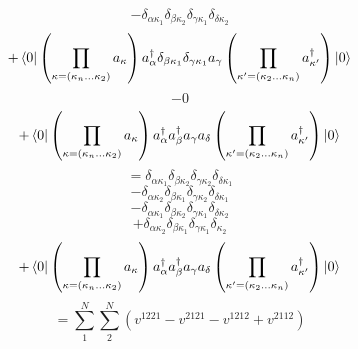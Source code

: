 \documentclass[12pt]{article}
\begin{document}
\begin{equation}
    -\delta _{\alpha  \kappa _{1}}\delta _{\beta  \kappa _{2}}\delta _{\gamma  \kappa _{1}}\delta _{\delta  \kappa _{2}}
\end{equation}
\begin{equation}
    +\bra{0}\left(\prod_{\kappa=\left(\kappa_{n}\dots\kappa_{2}\right)}a_{\kappa}\right)
        a^{\dag}_{\alpha }\delta _{\beta  \kappa _{1}}\delta _{\gamma  \kappa _{1}}a_{\gamma }
    \left(\prod_{\kappa^{\prime}=\left(\kappa_{2}\dots\kappa_{n}\right)}a^{\dag}_{\kappa^{\prime}}\right)\ket{0}
\end{equation}
\begin{equation}
    -0
\end{equation}
\begin{equation}
    +\bra{0}\left(\prod_{\kappa=\left(\kappa_{n}\dots\kappa_{2}\right)}a_{\kappa}\right)
        a^{\dag}_{\alpha }a^{\dag}_{\beta }a_{\gamma }a_{\delta }
    \left(\prod_{\kappa^{\prime}=\left(\kappa_{2}\dots\kappa_{n}\right)}a^{\dag}_{\kappa^{\prime}}\right)\ket{0}
\end{equation}
\begin{equation}
    =\delta _{\alpha  \kappa _{1}}\delta _{\beta  \kappa _{2}}\delta _{\gamma  \kappa _{2}}\delta _{\delta  \kappa _{1}}
\end{equation}
\begin{equation}
    -\delta _{\alpha  \kappa _{2}}\delta _{\beta  \kappa _{1}}\delta _{\gamma  \kappa _{2}}\delta _{\delta  \kappa _{1}}
\end{equation}
\begin{equation}
    -\delta _{\alpha  \kappa _{1}}\delta _{\beta  \kappa _{2}}\delta _{\gamma  \kappa _{1}}\delta _{\delta  \kappa _{2}}
\end{equation}
\begin{equation}
    +\delta _{\alpha  \kappa _{2}}\delta _{\beta  \kappa _{1}}\delta _{\gamma  \kappa _{1}}\delta _{ \kappa _{2}}
\end{equation}
\begin{equation}
    +\bra{0}\left(\prod_{\kappa=\left(\kappa_{n}\dots\kappa_{2}\right)}a_{\kappa}\right)
        a^{\dag}_{\alpha }a^{\dag}_{\beta }a_{\gamma }a_{\delta }
    \left(\prod_{\kappa^{\prime}=\left(\kappa_{2}\dots\kappa_{n}\right)}a^{\dag}_{\kappa^{\prime}}\right)\ket{0}
\end{equation}
\begin{equation}
    =\sum_{1}^{N} \sum_{2}^{N} \left(v^{1221}-v^{2121}-v^{1212}+v^{2112}\right)
\end{equation}
\end{document}
